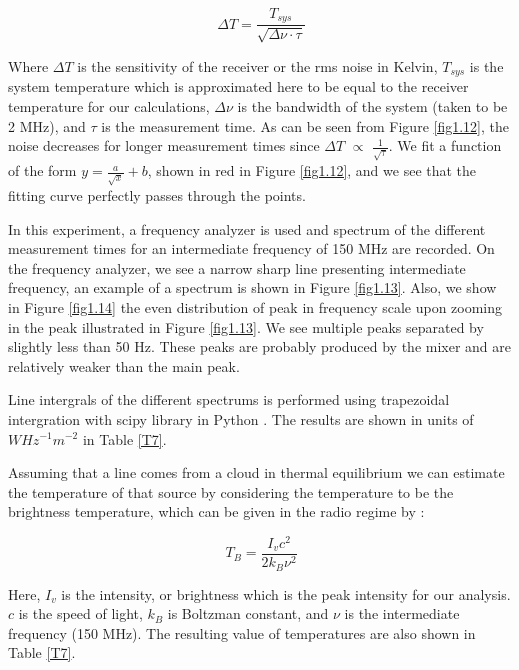 \documentclass[12pt]{article}
\begin{document}
\begin{equation}
\ \Delta T = \frac{T_{sys}}{\sqrt{\Delta \nu \cdot \tau}}
\end{equation}

Where $\Delta T$ is the sensitivity of the receiver or the rms noise in Kelvin, $T_{sys}$ is the system temperature which is approximated here to be equal to the receiver temperature for our calculations, $\Delta \nu$ is the bandwidth of the system (taken to be 2 MHz), and $\tau$ is the measurement time. 
As can be seen from Figure \ref{fig1.12}, the noise decreases for longer measurement times since $\Delta T$ $\propto$ $\frac{1}{\sqrt{\tau}}$. We fit a function of the form $y = \frac{a}{\sqrt{x}} + b$, shown in red in Figure \ref{fig1.12}, and we see that the fitting curve perfectly passes through the points. 

In this experiment, a frequency analyzer is used and spectrum of the different measurement times for an intermediate frequency of 150 MHz are recorded. On the frequency analyzer, we see a narrow sharp line presenting intermediate frequency, an example of a spectrum is shown in Figure \ref{fig1.13}. Also, we show in Figure \ref{fig1.14} the even distribution of peak in frequency scale upon zooming in the peak illustrated in Figure \ref{fig1.13}. We see multiple peaks separated by slightly less than 50 Hz. These peaks are probably produced by the mixer and are relatively weaker than the main peak.

Line intergrals of the different spectrums is performed using trapezoidal intergration with scipy library in Python \cite{scipy}. The results are shown in units of $W Hz^{-1} m^{-2}$ in Table \ref{T7}. 

Assuming that a line comes from a cloud in thermal equilibrium we can estimate the temperature of that source by considering the temperature to be the brightness temperature, which can be given in the radio regime by \cite{klein}:

\begin{equation}
\ T_{B} = \frac{I_{v} c^{2}}{2k_{B} \nu ^{2}}
\end{equation}

Here, $I_{v}$ is the intensity, or brightness which is the peak intensity for our analysis. $c$ is the speed of light, $k_{B}$ is Boltzman constant, and $\nu$ is the intermediate frequency (150 MHz). The resulting value of temperatures are also shown in Table \ref{T7}.
\end{document}

